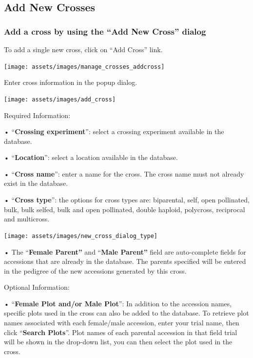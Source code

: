 \documentclass[
  12pt,
]{book}
\begin{document}
\hypertarget{add-new-crosses}{%
\subsection{Add New Crosses}\label{add-new-crosses}}

\hypertarget{add-a-cross-by-using-the-add-new-cross-dialog}{%
\subsubsection*{Add a cross by using the ``Add New Cross'' dialog}\label{add-a-cross-by-using-the-add-new-cross-dialog}}


To add a single new cross, click on ``Add Cross'' link.

\begin{center}\texttt{[image: assets/images/manage\_crosses\_addcross]} \end{center}

Enter cross information in the popup dialog.

\begin{center}\texttt{[image: assets/images/add\_cross]} \end{center}

Required Information:

• ``\textbf{Crossing experiment}'': select a crossing experiment available in the database.

• ``\textbf{Location}'': select a location available in the database.

• ``\textbf{Cross name}'': enter a name for the cross. The cross name must not already exist in the database.

• ``\textbf{Cross type}'': the options for cross types are: biparental, self, open pollinated, bulk, bulk selfed, bulk and open pollinated, double haploid, polycross, reciprocal and multicross.

\begin{center}\texttt{[image: assets/images/new\_cross\_dialog\_type]} \end{center}

• The ``\textbf{Female Parent''} and ``\textbf{Male Parent''} field are auto-complete fields for accessions that are already in the database. The parents specified will be entered in the pedigree of the new accessions generated by this cross.

Optional Information:

• ``\textbf{Female Plot and/or Male Plot}'': In addition to the accession names, specific plots used in the cross can also be added to the database. To retrieve plot names associated with each female/male accession, enter your trial name, then click ``\textbf{Search Plots}''. Plot names of each parental accession in that field trial will be shown in the drop-down list, you can then select the plot used in the cross.
\end{document}
